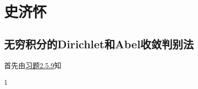 

\part{史济怀}
%





\chapter{无穷积分的Dirichlet和Abel收敛判别法}
首先由\hyperref[习题2.5.9]{习题2.5.9}知
\begin{dinglis}[Cauchy收敛原理]
\label{反常积分柯西}
1
\end{dinglis}



















